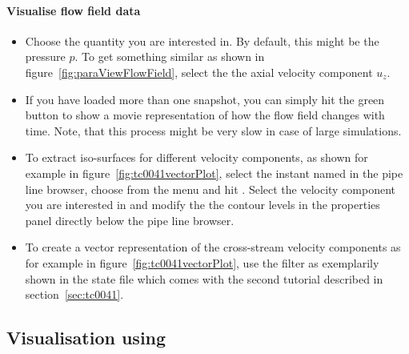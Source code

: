 \documentclass[a4paper, 11pt, DIV=11]{scrartcl}
\begin{document}
\paragraph{Visualise flow field data}
\begin{itemize}
\item
Choose the quantity you are interested in. By default, this
might be the pressure $p$. To get something similar as shown
in figure~\ref{fig:paraViewFlowField}, select the \eg the
axial velocity component $u_z$.
\item
If you have loaded more than one snapshot, you can simply hit
the green  button to show a movie representation of
how the flow field changes with time. Note, that this process
might be very slow in case of large simulations.
\item
To extract iso-surfaces for different velocity components, as
shown for example in figure~\ref{fig:tc0041vectorPlot}, select
the instant named  in the pipe
line browser, choose  from the menu and hit . Select the velocity
component you are interested in and modify the the contour levels
in the properties panel directly below the pipe line browser.
\item
To create a vector representation of the cross-stream velocity
components as for example in figure~\ref{fig:tc0041vectorPlot},
use the  filter as exemplarily shown in the \paraview
state file  which comes with the second
tutorial described in section~\ref{sec:tc0041}.
\end{itemize}

\subsection{Visualisation using \visit}
\label{sec:visit}
\end{document}
